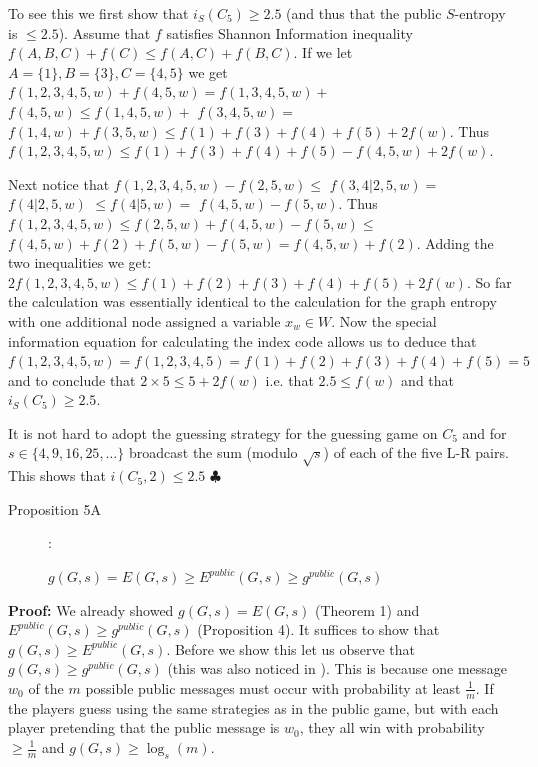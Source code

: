 \documentclass[12pt]{article}
\begin{document}
To see this we first show that 
$i_S(C_5) \geq 2.5$ (and thus that the public $S$-entropy is $\leq 2.5$). Assume that $f$ satisfies Shannon Information inequality
 $f(A,B,C)+f(C) \leq  f(A,C) + f(B,C)$.  If we let $A=\{1\}, B=\{3\}, C=\{4,5\}$ we get
  $f(1,2,3,4,5,w)+f(4,5,w)=f(1,3,4,5,w)+$  $f(4,5,w)  \leq
 f(1,4,5,w)+$  $f(3,4,5,w)=$  $f(1,4,w)+f(3,5,w)  \leq f(1)+f(3)+f(4)+f(5)+2f(w)$. 
Thus $f(1,2,3,4,5,w) \leq  f(1)+f(3)+f(4)+f(5)-f(4,5,w)+2f(w)$.

\noindent
 Next notice that  $f(1,2,3,4,5,w)-f(2,5,w) \leq $ $f(3,4 | 2,5,w)=$ $f(4| 2,5,w)$ 
 $\leq f(4|5,w)=$
$f(4,5,w)-f(5,w)$.  Thus $f(1,2,3,4,5,w) \leq f(2,5,w)+f(4,5,w)-f(5,w) \leq $ 
$f(4,5,w)+f(2)+f(5,w)-f(5,w)=f(4,5,w)+f(2)$.
 Adding the two inequalities we get: $2f(1,2,3,4,5,w) \leq f(1)+f(2)+f(3)+f(4)+f(5)+2f(w)$.
So far the calculation was essentially identical to the calculation for the graph entropy
with one additional node assigned a variable $x_w \in W$. Now 
the special information equation for calculating the index code
allows us to deduce that $f(1,2,3,4,5,w)=f(1,2,3,4,5)=f(1)+f(2)+f(3)+f(4)+f(5)=5$ and to
conclude that $2 \times 5 \leq 5+2f(w)$ i.e. that $2.5 \leq f(w)$ and that  $i_S(C_5) \geq 2.5$.

It is not hard to adopt the guessing strategy for the guessing game on $C_5$ and for $s \in \{4,9,16,25, \ldots \}$ broadcast  the sum (modulo $\sqrt{s}$) of each of the five L-R pairs. This shows that 
$i(C_5,2) \leq 2.5$  
\hfill $\clubsuit$

\begin{description}

\item[Proposition 5A]:

$g(G,s)=E(G,s) \geq E^{public}(G,s) \geq g^{public}(G,s)$

\end{description}

\noindent
{\bf Proof:} We already showed  $g(G,s)=E(G,s)$ (Theorem 1) and 
$E^{public}(G,s) \geq g^{public}(G,s)$ (Proposition 4). It suffices to show that $g(G,s) \geq E^{public}(G,s)$. Before we show this let us observe that $g(G,s) \geq g^{public}(G,s)$ (this was also
noticed in \cite{Riis05,Riis07}). This is because 
one message $w_0$ of the $m$ possible public messages must 
occur with probability at least $\frac{1}{m}$. If the players guess using the same strategies as in the public game, but with each player pretending that the public message is $w_0$, they all win with probability $\geq \frac{1}{m}$ and $g(G,s) \geq \log_s(m)$.
\end{document}
